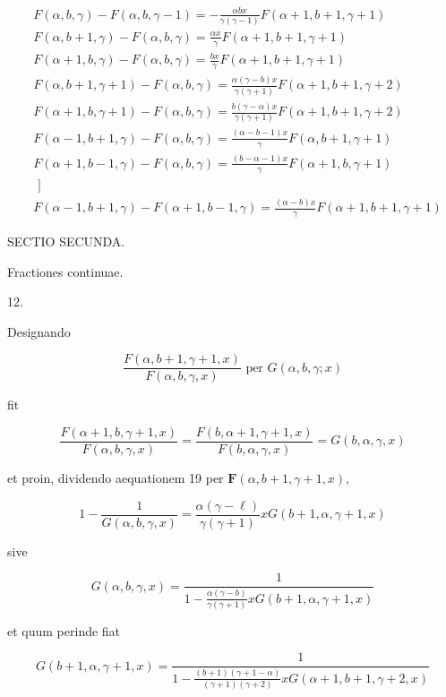 \documentclass[10pt]{article}
\begin{document}
\[
\begin{aligned}
& F(\alpha, b, \gamma)-F(\alpha, b, \gamma-1)=-\frac{\alpha b x}{\gamma(\gamma-1)} F(\alpha+1, b+1, \gamma+1) \\
& F(\alpha, b+1, \gamma)-F(\alpha, b, \gamma)=\frac{\alpha x}{\gamma} F(\alpha+1, b+1, \gamma+1) \\
& F(\alpha+1, b, \gamma)-F(\alpha, b, \gamma)=\frac{b x}{\gamma} F(\alpha+1, b+1, \gamma+1) \\
& F(\alpha, b+1, \gamma+1)-F(\alpha, b, \gamma)=\frac{\alpha(\gamma-b) x}{\gamma(\gamma+1)} F(\alpha+1, b+1, \gamma+2) \\
& F(\alpha+1, b, \gamma+1)-F(\alpha, b, \gamma)=\frac{b(\gamma-\alpha) x}{\gamma(\gamma+1)} F(\alpha+1, b+1, \gamma+2) \\
& F(\alpha-1, b+1, \gamma)-F(\alpha, b, \gamma)=\frac{(\alpha-b-1) x}{\gamma} F(\alpha, b+1, \gamma+1) \\
& F(\alpha+1, b-1, \gamma)-F(\alpha, b, \gamma)=\frac{(b-\alpha-1) x}{\gamma} F(\alpha+1, b, \gamma+1) \\
& \text { ] } \\
& F(\alpha-1, b+1, \gamma)-F(\alpha+1, b-1, \gamma)=\frac{(\alpha-b) x}{\gamma} F(\alpha+1, b+1, \gamma+1)
\end{aligned}
\]

SECTIO SECUNDA.

Fractiones continuae.

12.

Designando

\[
\frac{F(\alpha, b+1, \gamma+1, x)}{F(\alpha, b, \gamma, x)} \text { per } G(\alpha, b, \gamma ; x)
\]

fit

\[
\frac{F(\alpha+1, b, \gamma+1, x)}{F(\alpha, b, \gamma, x)}=\frac{F(b, \alpha+1, \gamma+1, x)}{F(b, \alpha, \gamma, x)}=G(b, \alpha, \gamma, x)
\]

et proin, dividendo aequationem 19 per \(\boldsymbol{F}(\alpha, b+1, \gamma+1, x)\),

\[
1-\frac{1}{G(\alpha, b, \gamma, x)}=\frac{\alpha(\gamma-\ell)}{\gamma(\gamma+1)} x G(b+1, \alpha, \gamma+1, x)
\]

sive

\[
G(\alpha, b, \gamma, x)=\frac{1}{1-\frac{\alpha(\gamma-b)}{\gamma(\gamma+1)} x G(b+1, \alpha, \gamma+1, x)}
\]

et quum perinde fiat

\[
G(b+1, \alpha, \gamma+1, x)=\frac{1}{1-\frac{(b+1)(\gamma+1-\alpha)}{(\gamma+1)(\gamma+2)} x G(\alpha+1, b+1, \gamma+2, x)}
\]
\end{document}
